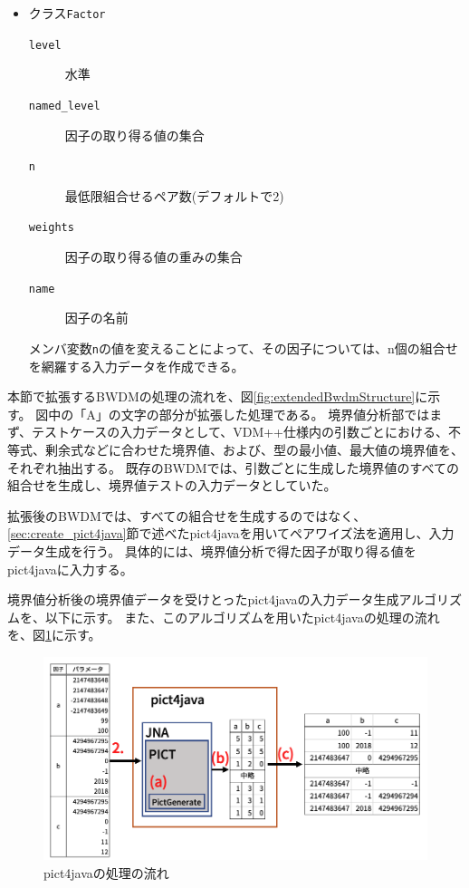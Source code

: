 \documentclass[uplatex, report, a4j, 10pt]{jsbook}
\newcommand\ttt[1]{\texttt{#1}}
\begin{document}
\begin{itemize}
\begin{description}
        \end{description}
  \item クラス\ttt{Factor}
        \begin{description}
          \item[\ttt{level}] 水準
          \item[\ttt{named\_level}] 因子の取り得る値の集合
          \item[\ttt{n}] 最低限組合せるペア数(デフォルトで2)
          \item[\ttt{weights}] 因子の取り得る値の重みの集合
          \item[\ttt{name}] 因子の名前
        \end{description}
        メンバ変数\ttt{n}の値を変えることによって、その因子については、n個の組合せを網羅する入力データを作成できる。
\end{itemize}

本節で拡張するBWDMの処理の流れを、図\ref{fig:extendedBwdmStructure}に示す。
図中の「A」の文字の部分が拡張した処理である。
境界値分析部ではまず、テストケースの入力データとして、VDM++仕様内の引数ごとにおける、不等式、剰余式などに合わせた境界値、および、型の最小値、最大値の境界値を、それぞれ抽出する。
既存のBWDMでは、引数ごとに生成した境界値のすべての組合せを生成し、境界値テストの入力データとしていた。

拡張後のBWDMでは、すべての組合せを生成するのではなく、\ref{sec:create_pict4java}節で述べたpict4javaを用いてペアワイズ法を適用し、入力データ生成を行う。
具体的には、境界値分析で得た因子が取り得る値をpict4javaに入力する。

境界値分析後の境界値データを受けとったpict4javaの入力データ生成アルゴリズムを、以下に示す。
また、このアルゴリズムを用いたpict4javaの処理の流れを、図\ref{fig:pict4java}に示す。

\begin{figure}[tp]
  \centering
  \includegraphics[keepaspectratio, width=160mm]{figs/pict4java}
  \caption{pict4javaの処理の流れ}
  \label{fig:pict4java}
\end{figure}
\end{document}
